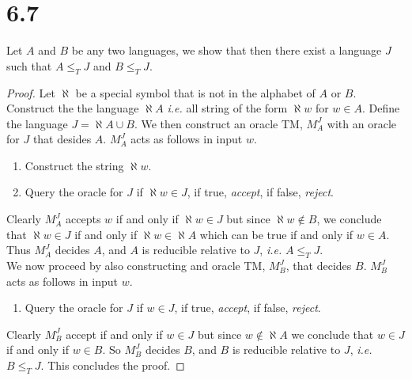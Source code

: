 \documentclass[a4paper,11pt]{article}
\newcommand{\ie}{\emph{i.e.} }
\numberwithin{equation}{section}
\begin{document}
\section*{6.7}
Let $ A $ and $ B $ be any two languages, we show that then there exist a language $ J $ such that $ A\leq_T J $ and $ B\leq_T J $.
\begin{proof}
	Let $ \aleph $ be a special symbol that is not in the alphabet of $ A $ or $ B $. Construct the the language $ \aleph A $ \ie all string of the form $ \aleph w $ for $ w\in A $. Define the language $ J=\aleph A\cup B $. We then construct an oracle TM, $ M^J_A $ with an oracle for $ J $ that desides $ A $. $ M_A^J $ acts as follows in input $ w $. \begin{enumerate}
		\item Construct the string $ \aleph w $.
		\item Query the oracle for $ J $ if $ \aleph w\in J $, if true, \emph{accept}, if false, \emph{reject}.
	\end{enumerate}
	Clearly $ M_A^J $ accepts $ w $ if and only if $ \aleph w\in J $ but since $ \aleph w\notin B $, we conclude that $ \aleph w\in J $ if and only if $ \aleph w\in \aleph A $ which can be true if and only if $ w\in A $. Thus $ M_A^J $ decides $ A $, and $ A $ is reducible relative to $ J $, \ie $ A\leq_T J $.\\
	We now proceed by also constructing and oracle TM, $ M_B^J $, that decides $ B $. $ M_B^J $ acts as follows in input $ w $. \begin{enumerate}
		\item Query the oracle for $ J $ if $ w\in J $, if true, \emph{accept}, if false, \emph{reject}.
	\end{enumerate}
	Clearly $ M_B^J $ accept if and only if $ w\in J $ but since $ w\notin \aleph A $ we conclude that $ w\in J $ if and only if $ w\in B $. So $ M_B^J $ decides $ B $, and $ B $ is reducible relative to $ J $, \ie $ B\leq_T J $. This concludes the proof.
\end{proof}
\end{document}
